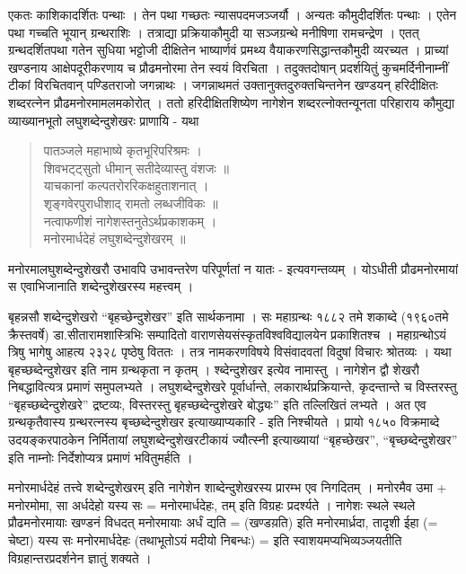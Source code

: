 एकतः काशिकादर्शितः पन्थाः । तेन पथा गच्छतः न्यासपदमजञ्जर्यौ । अन्यतः कौमुदीदर्शितः पन्थाः । एतेन पथा गच्चति भूयान् ग्रन्थराशिः । तत्राद्या प्रक्रियाकौमुदी या सञ्जग्रन्थे मनीषिणा रामचन्द्रेण । एतत् ग्रन्थदर्शितपथा गतेन सुधिया भट्टोजी दीक्षितेन भाष्यार्णवं प्रमथ्य वैयाकरणसिद्धान्तकौमुदी व्यरच्यत । प्राच्यां खण्डनाय आक्षेपदूरीकरणाय च प्रौढमनोरमा तेन स्वयं विरचिता । तदुक्तदोषान् प्रदर्शयितुं कुचमर्दिनीनाम्नीं टीकां विरचितवान् पण्डितराजो जगन्नाथः । जगन्नाथमतं उक्तानुक्तदुरुक्तचिन्तनेन खण्डयन् हरिदीक्षितः शब्दरत्नेन प्रौढमनोरमामलमकोरोत् । ततो हरिदीक्षितशिष्येण नागेशेन शब्दरत्नोक्तन्यूनता परिहाराय कौमुद्या व्याख्यानभूतो लघुशब्देन्दुशेखरः प्राणायि - यथा 

\begin{verse}
पातञ्जले महाभाष्ये कृतभूरिपरिश्रमः ।\\
शिवभट्ट्सुतो धीमान् सतीदेव्यास्तु वंशजः ॥\\
याचकानां कल्पतरोररिकक्षहुताशनात् ।\\
शृङ्गवेरपुराधीशाद् रामतो लब्धजीविकः ॥\\
नत्वाफणीशं नागेशस्तनुतेऽर्थप्रकाशकम् ।\\
मनोरमार्धदेहं लघुशब्देन्दुशेखरम् ॥
\end{verse}

मनोरमालघुशब्देन्दुशेखरौ उभावपि उभावन्तरेण परिपूर्णतां न यातः - इत्यवगन्तव्यम् । योऽधीती प्रौढमनोरमायां स एवाभिजानाति शब्देन्दुशेखरस्य महत्त्वम् ।

बृहन्नसौ शब्देन्दुशेखरो “बृहच्छेन्दुशेखर” इति सार्थकनामा । सः महाग्रन्थः १८८२ तमे शकाब्दे (१९६०तमे क्रैस्तवर्षे) डा.सीतारामशास्त्रिभिः सम्पादितो वाराणसेयसंस्कृतविश्वविद्यालयेन प्रकाशितश्च । महाग्रन्थोऽयं त्रिषु भागेषु आहत्य २३२८ पृष्ठेषु विततः । तत्र नामकरणविषये विसंवादवतां विदुषां विचारः श्रोतव्यः । यथा बृहच्छब्देन्दुशेखर इति नाम ग्रन्थकृता न कृतम् । श्ब्देन्दुशेखर इत्येव नामास्तु । नागेशेन द्वौ शेखरौ निबद्धावित्यत्र प्रमाणं समुपलभ्यते । लघुशब्देन्दुशेखरे पूर्वार्धान्ते, लकारार्थप्रक्रियान्ते, कृदन्तान्ते च विस्तरस्तु “बृहच्छब्देन्दुशेखरे” द्रष्टव्यः, विस्तरस्तु बृहच्छब्देन्दुशेखरे बोद्ध्यः” इति तल्लिखितं लभ्यते । अत एव ग्रन्थकृतैवास्य ग्रन्थरत्नस्य बृच्छब्देन्दुशेखर इत्याख्याप्यकारि - इति निश्चीयते । प्रायो १८५० विक्रमाब्दे उदयङ्करपाठकेन निर्मितायां लघुशब्देन्दुशेखरटीकायं ज्यौत्स्नी इत्याख्यायां “बृहच्छेखर”, “बृच्छब्देन्दुशेखर” इति नाम्नोः निर्देशोप्यत्र प्रमाणं भवितुमर्हति ।

मनोरमार्धदेहं तत्त्वे शब्देन्दुशेखरम् इति नागेशेन शाब्देन्दुशेखरस्य प्रारम्भ एव निगदितम् । मनोरमैव उमा + मनोरमोमा, सा अर्धदेहो यस्य सः = मनोरमार्धदेहः, तम् इति विग्रहः प्रदर्श्यते । नागेशः स्थले स्थले प्रौढमनोरमायाः खण्डनं विधदत् मनोरमायाः अर्धं द्यति = (खण्डय़ति) इति मनोरमार्ध्रदा, तादृशी ईहा (= चेष्टा) यस्य सः मनोरमार्धदेहः (तथाभूतोऽयं मदीयो निबन्धः) = इति स्वाशयमप्यभिव्यञ्जयतीति विग्रहान्तरप्रदर्शनेन ज्ञातुं शक्यते ।

